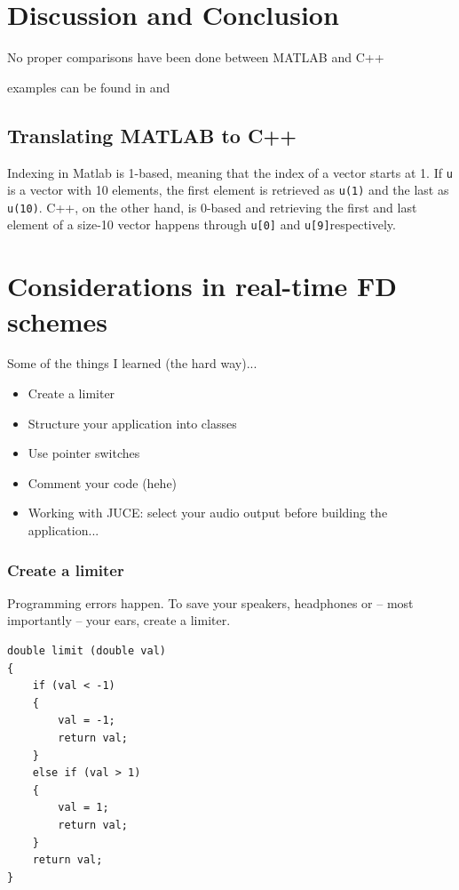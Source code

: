 \section{Discussion and Conclusion}
No proper comparisons have been done between MATLAB and C++

examples can be found in \cite{Webb2015} and \cite{Bilbao2019CMJb}





\subsection{Translating MATLAB to C++}
Indexing in
Matlab is 1-based, meaning that the index of a vector starts at 1. If \texttt{u} is a vector with 10 elements, the first element is retrieved as \texttt{u(1)} and the last as \texttt{u(10)}. C++, on the other hand, is 0-based and retrieving the first and last element of a size-10 vector happens through \texttt{u[0]} and \texttt{u[9]}respectively. 

\section{Considerations in real-time FD schemes}

Some of the things I learned (the hard way)...
\begin{itemize}
    \item Create a limiter
    \item Structure your application into classes 
    \item Use pointer switches
    \item Comment your code (hehe)
    \item Working with JUCE: select your audio output before building the application...
\end{itemize}

\subsubsection{Create a limiter}
Programming errors happen. To save your speakers, headphones or -- most importantly -- your ears, create a limiter. 

\setlstCpp
\begin{lstlisting}
double limit (double val)
{
    if (val < -1)
    {
        val = -1;
        return val;
    }
    else if (val > 1)
    {
        val = 1;
        return val;
    }
    return val;
}
\end{lstlisting}

